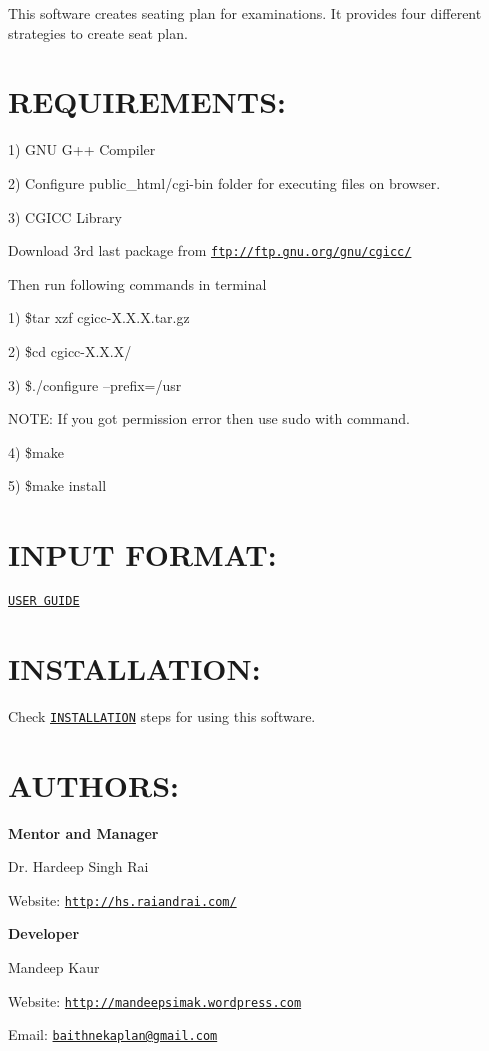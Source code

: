 This software creates seating plan for examinations. It provides four different strategies to create seat plan.

\section*{R\-E\-Q\-U\-I\-R\-E\-M\-E\-N\-T\-S\-:}

1) G\-N\-U G++ Compiler

2) Configure public\-\_\-html/cgi-\/bin folder for executing files on browser.

3) C\-G\-I\-C\-C Library\par
 Download 3rd last package from \href{ftp://ftp.gnu.org/gnu/cgicc/}{\tt ftp\-://ftp.\-gnu.\-org/gnu/cgicc/}\par


Then run following commands in terminal

1) \$tar xzf cgicc-\/\-X.\-X.\-X.\-tar.\-gz

2) \$cd cgicc-\/\-X.\-X.\-X/

3) \$./configure --prefix=/usr

N\-O\-T\-E\-: If you got permission error then use sudo with command.

4) \$make

5) \$make install

\section*{I\-N\-P\-U\-T F\-O\-R\-M\-A\-T\-:}

\href{https://github.com/GreatDevelopers/bakaplan/blob/master/USER%20GUIDE}{\tt U\-S\-E\-R G\-U\-I\-D\-E}

\section*{I\-N\-S\-T\-A\-L\-L\-A\-T\-I\-O\-N\-:}

Check \href{https://github.com/GreatDevelopers/bakaplan/blob/master/INSTALLATION}{\tt I\-N\-S\-T\-A\-L\-L\-A\-T\-I\-O\-N} steps for using this software.

\section*{A\-U\-T\-H\-O\-R\-S\-:}

{\bfseries Mentor and Manager}

Dr. Hardeep Singh Rai

Website\-: \href{http://hs.raiandrai.com/}{\tt http\-://hs.\-raiandrai.\-com/}

{\bfseries Developer}

Mandeep Kaur

Website\-: \href{http://mandeepsimak.wordpress.com}{\tt http\-://mandeepsimak.\-wordpress.\-com}

Email\-: \href{mailto:baithnekaplan@gmail.com}{\tt baithnekaplan@gmail.\-com} 
